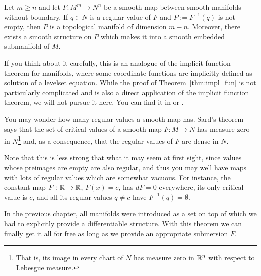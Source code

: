\begin{theorem}\label{thm:impl_fun}
	Let $m\geq n$ and let $F: M^m \to N^n$ be a smooth map between smooth manifolds without boundary.
	If $q\in N$ is a regular value of $F$ and $P := F^{-1}(q)$ is not empty, then $P$ is a topological manifold of dimension $m-n$.
	Moreover, there exists a smooth structure on $P$ which makes it into a smooth embedded submanifold of $M$.
\end{theorem}

If you think about it carefully, this is an analogue of the implicit function theorem for manifolds, where some coordinate functions are implicitly defined as solution of a levelset equation.
While the proof of Theorem~\ref{thm:impl_fun} is not particularly complicated and is also a direct application of the implicit function theorem, we will not pursue it here. You can find it in \cite[Corollary 5.14]{book:lee} or \cite[Theorem 9.9]{book:tu}.

\begin{remark}
	You may wonder how many regular values a smooth map has.
	Sard's theorem~\cite[Theorem 6.10 and Proposition 6.8]{book:lee} says that the set of critical values of a smooth map $F:M\to N$ has measure zero in $N$\footnote{That is, its image in every chart of $N$ has measure zero in $\mathbb{R}^n$ with respect to Lebesgue measure.} and, as a consequence, that the regular values of $F$ are dense in $N$.

	Note that this is less strong that what it may seem at first sight, since values whose preimages are empty are also regular, and thus you may well have maps with lots of regular values which are somewhat vacuous. For instance, the constant map $F:\mathbb{R}\to\mathbb{R}$, $F(x)=c$, has $dF=0$ everywhere, its only critical value is $c$, and all its regular values $q\neq c$ have $F^{-1}(q)=\emptyset$.
\end{remark}

In the previous chapter, all manifolds were introduced as a set on top of which we had to explicitly provide a differentiable structure. With this theorem we can finally get it all for free as long as we provide an appropriate submersion $F$.

